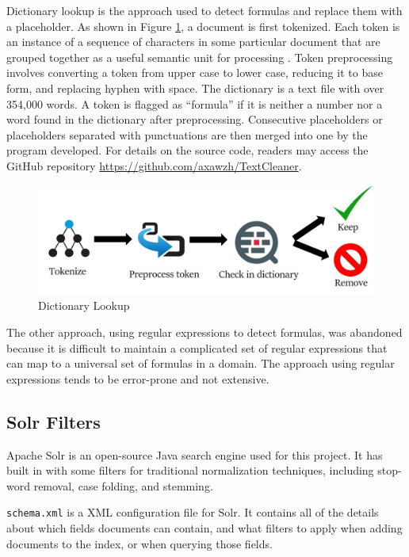 Dictionary lookup is the approach used to detect formulas and replace them with a placeholder. As shown in Figure \ref{fig:dict_lookup}, a document is first tokenized. Each token is an instance of a sequence of characters in some particular document that are grouped together as a useful semantic unit for processing \cite{Manning2008}. Token preprocessing involves converting a token from upper case to lower case, reducing it to base form, and replacing hyphen with space. The dictionary is a text file with over 354,000 words. A token is flagged as \enquote{formula} if it is neither a number nor a word found in the dictionary after preprocessing. Consecutive placeholders or placeholders separated with punctuations are then merged into one by the program developed. For details on the source code, readers may access the GitHub repository \url{https://github.com/axawzh/TextCleaner}.

\begin{figure}[!htbp]
  \includegraphics[width=.9\textwidth]{proposed_methodology_and_system_specifications/dictionary_lookup.jpg}
  \caption{Dictionary Lookup}
  \label{fig:dict_lookup}
\end{figure}

The other approach, using regular expressions to detect formulas, was abandoned because it is difficult to maintain a complicated set of regular expressions that can map to a universal set of formulas in a domain. The approach using regular expressions tends to be error-prone and not extensive.

\subsection{Solr Filters}
\label{subsec:solr_filters}
Apache Solr is an open-source Java search engine used for this project. It has built in with some filters for traditional normalization techniques, including stop-word removal, case folding, and stemming. 

\texttt{schema.xml} is a XML configuration file for Solr. It contains all of the details about which fields documents can contain, and what filters to apply when adding documents to the index, or when querying those fields.

